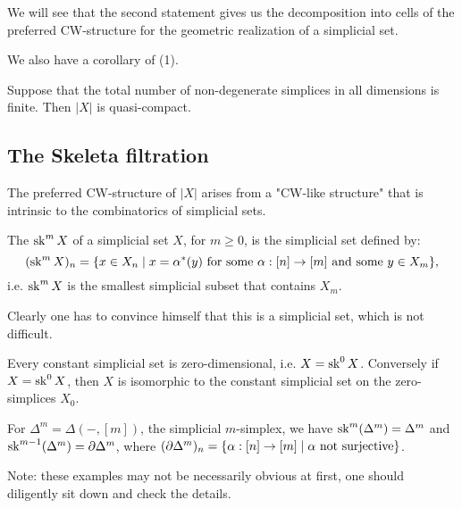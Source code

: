 We will see that the second statement gives us the decomposition into cells of the preferred CW-structure for the geometric realization of a simplicial set.

We also have a corollary of (1).

\begin{corollary}\label{corollary:criterion-for-compactness-of-realization}
Suppose that the total number of non-degenerate simplices in all dimensions is finite. Then $|X|$ is quasi-compact.
\end{corollary}

\subsection{The Skeleta filtration}

The preferred CW-structure of $|X|$ arises from a "CW-like structure" that is intrinsic to the combinatorics of simplicial sets.

The  $\operatorname{sk}^m X$ of a simplicial set $X$, for $m\ge0$, is the simplicial set defined by:
\[(\operatorname{sk}^m X)_n=\{x\in X_n\mid x=\alpha^*(y)\text{ for some }\alpha:[n]\to[m]\text{ and some }y\in X_m\},\]
i.e. $\operatorname{sk}^m X$ is the smallest simplicial subset that contains $X_m$.

Clearly one has to convince himself that this is a simplicial set, which is not difficult.

\begin{example}
Every constant simplicial set is zero-dimensional, i.e. $X=\operatorname{sk}^0 X$. Conversely if $X=\operatorname{sk}^0 X$, then $X$ is isomorphic to the constant simplicial set on the zero-simplices $X_0$.
\end{example}

\begin{example}
For $\Delta^m=\Delta(-,[m])$, the simplicial $m$-simplex, we have $\operatorname{sk}^m(\Delta^m)=\Delta^m$ and $\operatorname{sk}^{m-1}(\Delta^m)=\partial\Delta^m$, where $(\partial\Delta^m)_n=\{\alpha:[n]\to[m]\mid\alpha\text{ not surjective}\}$.
\end{example}

Note: these examples may not be necessarily obvious at first, one should diligently sit down and check the details.
